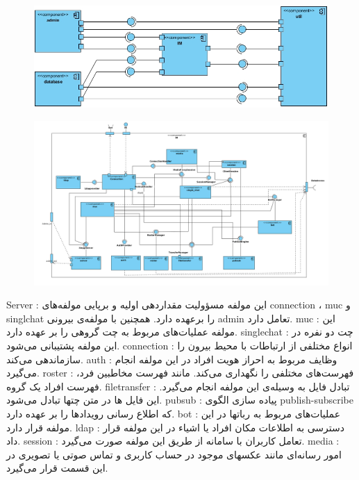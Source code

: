 \begin{figure}[H]
\centering
\includegraphics[scale=.4]{img/lvl1.jpg}
\caption{}

\end{figure}
\begin{figure}[H]
\centering
\includegraphics[scale=.28]{img/im.png}
\caption{}

\end{figure}
\begin{itemize}

 Server : این مولفه مسؤولیت مقداردهی اولیه و برپایی مولفه‌های connection ، muc و singlchat را برعهده دارد. همچنین با مولفه‌ی بیرونی admin تعامل دارد.
 muc : این مولفه عملیات‌های مربوط به چت گروهی را بر عهده دارد.
 singlechat : چت دو نفره در این مولفه پشتیبانی می‌شود. 
 connection :  انواع مختلفی از ارتباطات با محیط بیرون را سازماندهی می‌کند.
 auth : وظایف مربوط به احراز هویت افراد در این مولفه انجام می‌گیرد.
 roster : فهرست‌های مختلفی را نگهداری می‌کند. مانند فهرست مخاطبین فرد، فهرست افراد یک گروه.
 filetransfer : تبادل فایل به وسیله‌ی این مولفه انجام می‌گیرد. این فایل ها در متن چتها تبادل می‌شود.
  pubsub : پیاده سازی الگوی publish-subscribe که اطلاع رسانی رویدادها را بر عهده دارد. 
 bot : عملیات‌های مربوط به رباتها در این مولفه قرار دارد.
 ldap : دسترسی به اطلاعات مکان افراد یا اشیاء در این مولفه قرار داد. 
 session : تعامل کاربران با سامانه از طریق این مولفه صورت می‌گیرد.
 media : امور رسانه‌ای مانند عکسهای موجود در حساب کاربری و تماس صوتی یا تصویری در این قسمت قرار می‌گیرد.
\end{itemize}




